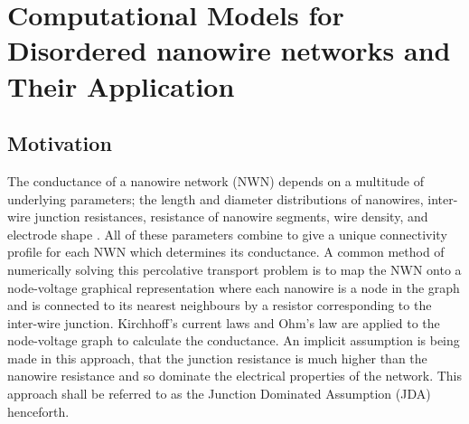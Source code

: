 \chapter{Computational Models for Disordered nanowire networks and Their Application}
\section{Motivation}
The conductance of a nanowire network (NWN) depends on a multitude of underlying parameters; the length and diameter distributions of nanowires\cite{hecht2006,bergin2012,sorel2012,hicks2009,pike1974}, inter-wire junction resistances\cite{mutiso2013}, resistance of nanowire segments{\cite{zezelj2012}, wire density\cite{balberg1983}}, and electrode shape \cite{fairfield2014}. All of these parameters combine to give a unique connectivity profile for each NWN which determines its conductance. A common method of numerically solving this percolative transport problem\cite{kirkpatrick1973} is to map the NWN onto a node-voltage graphical representation where each nanowire is a node in the graph and is connected to its nearest neighbours by a resistor corresponding to the inter-wire junction. Kirchhoff's current laws and Ohm's law are applied to the node-voltage graph to calculate the conductance\cite{graph_book}. An implicit assumption is being made in this approach, that the junction resistance is much higher than the nanowire resistance and so dominate the electrical properties of the network. This approach shall be referred to as the Junction Dominated Assumption (JDA) henceforth. 

